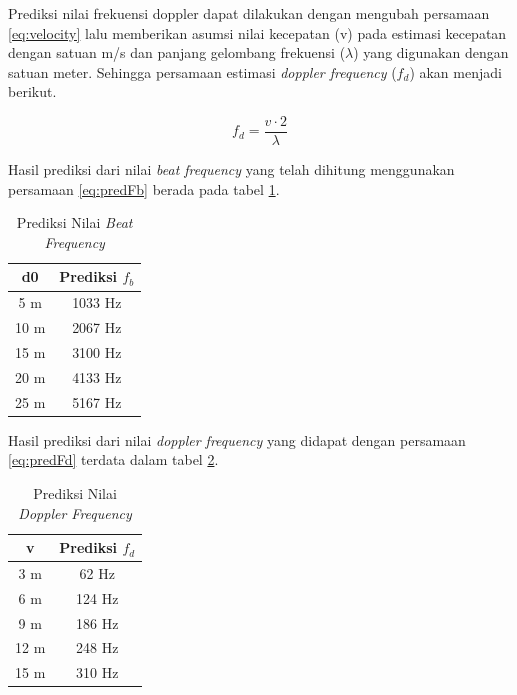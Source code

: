 Prediksi nilai frekuensi doppler dapat dilakukan dengan mengubah persamaan \ref{eq:velocity} lalu memberikan asumsi nilai kecepatan (v) pada estimasi kecepatan dengan satuan m/s dan panjang gelombang frekuensi ($\lambda$) yang digunakan dengan satuan meter. Sehingga persamaan estimasi \textit{doppler frequency} ($f_{d}$) akan menjadi berikut.

\begin{equation}
	f_{d} = \frac{v \cdot 2}{\lambda}
	\label{eq:predFd}
\end{equation}

Hasil prediksi dari nilai \textit{beat frequency} yang telah dihitung menggunakan persamaan \ref{eq:predFb} berada pada tabel \ref{tab:predFbeat}.

\begin{center}
	\begin{longtable}{|c|c|}
		\caption{Prediksi Nilai \textit{Beat Frequency}}
		\label{tab:predFbeat}\\
		\hline
		d0 & Prediksi $f_{b}$  \\
		\hline
		5 m & 1033 Hz\\
		\hline
		10 m & 2067 Hz\\
		\hline
		15 m & 3100 Hz\\
		\hline
		20 m & 4133 Hz\\
		\hline
		25 m & 5167 Hz\\
		\hline
	\end{longtable}
\end{center}

Hasil prediksi dari nilai \textit{doppler frequency} yang didapat dengan persamaan \ref{eq:predFd} terdata dalam tabel \ref{tab:predFdopp}.

\begin{center}
	\begin{longtable}{|c|c|}
		\caption{Prediksi Nilai \textit{Doppler Frequency}}
		\label{tab:predFdopp}\\
		\hline
		v & Prediksi $f_{d}$  \\
		\hline
		3 m & 62 Hz\\
		\hline
		6 m & 124 Hz\\
		\hline
		9 m & 186 Hz\\
		\hline
		12 m & 248 Hz\\
		\hline
		15 m & 310 Hz\\
		\hline
	\end{longtable}
\end{center}